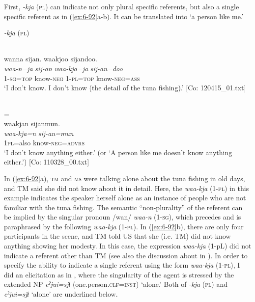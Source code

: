 First, \textit{-kja} (\textsc{pl}) can indicate not only plural specific referents, but also a single specific referent as in (\ref{ex:6-92}a-b). It can be translated into ‘a person like me.’

\ea\label{ex:6-92}
  \textit{-kja} (\textsc{pl})

 \ea{}\\
{\TM}
\glll  wanna  sijan.  waakjoo  sijandoo.\\
\textit{waa-n=ja}  \textit{sij-an}  \textit{waa-kja=ja}  \textit{sij-an=doo}\\
1-\textsc{sg}=\textsc{top}  know-\textsc{neg}  1-\textsc{pl}=\textsc{top}  know-\textsc{neg}=\textsc{ass}\\
\glt ‘I don’t know. I don’t know (the detail of the tuna fishing).’ [Co: 120415\_01.txt]

\ex{}\\
= \\

{\TM}
\glll waakjan  sijanmun.\\
      \textit{waa-kja=n}  \textit{sij-an=mun}\\
      1\textsc{pl}=also  know-\textsc{neg}=\textsc{advrs}\\
\glt ‘I don’t know anything either.’ (or ‘A person like me doesn’t know anything either.’)      [Co: 110328\_00.txt]
\z
\z

In (\ref{ex:6-92}a), \textsc{tm} and \textsc{ms} were talking alone about the tuna fishing in old days, and TM said she did not know about it in detail. Here, the \textit{waa-kja} (1-\textsc{pl}) in this example indicates the speaker herself alone as an instance of people who are not familiar with the tuna fishing. The semantic “non-plurality” of the referent can be implied by the singular pronoun /wan/ \textit{waa-n} (1-\textsc{sg}), which precedes and is paraphrased by the following \textit{waa-kja} (1-\textsc{pl}). In (\ref{ex:6-92}b), there are only four participants in the scene, and TM told US that she (i.e. TM) did not know anything showing her modesty. In this case, the expression \textit{waa-kja} (1-pL) did not indicate a referent other than TM (see also the discussion about  in ). In order to specify the ability to indicate a single referent using the form \textit{waa-kja} (1-\textsc{pl}), I did an elicitation as in , where the singularity of the agent is stressed by the extended NP \textit{cˀjui=sjɨ} (one.person.\textsc{clf}=\textsc{inst}) ‘alone.’ Both of \textit{-kja} (\textsc{pl}) and \textit{cˀjui=sjɨ} ‘alone’ are underlined below.


